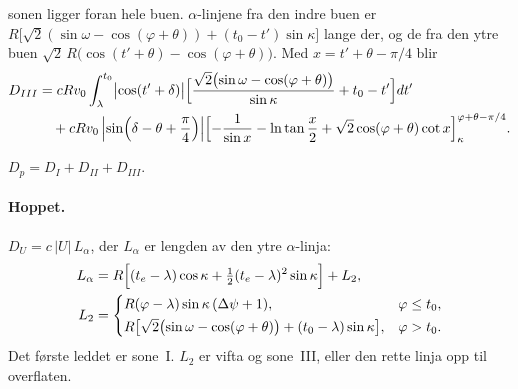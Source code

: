 \documentclass[11pt,a4paper]{article}
\begin{document}
\begin{itemize}
        sonen ligger foran hele buen.  $\alpha$-linjene fra den indre buen er
        $R\bigl[\sqrt2(\sin\omega - \cos(\varphi + \theta)) + (t_0 -
        t')\sin\kappa\bigr]$ lange der, og de fra den ytre buen
        $\sqrt2\,R\bigl(\cos(t' + \theta) - \cos(\varphi + \theta)\bigr)$.
        Med $x = t' + \theta - \pi/4$ blir
\begin{align}
  D_{III} &= c R v_0 \int_\lambda^{t_0} \bigl|\cos(t' + \delta)\bigr|
             \Bigl[\frac{\sqrt2\bigl(\sin\omega - \cos(\varphi + \theta)\bigr)}{\sin\kappa}
             + t_0 - t'\Bigr] dt'
             \nonumber\\
          &\quad + c R v_0 \,\Bigl|\sin\Bigl(\delta - \theta + \frac{\pi}{4}\Bigr)\Bigr|
             \Bigl[-\frac{1}{\sin x} - \ln\tan\frac{x}{2}
             + \sqrt2\cos(\varphi + \theta)\cot x\Bigr]_{\kappa}^{\varphi + \theta - \pi/4} .
\end{align}
\end{itemize}
$D_p = D_I + D_{II} + D_{III}$.

\paragraph{Hoppet.}  $D_U = c\,|U|\,L_\alpha$, der $L_\alpha$ er lengden av
den ytre $\alpha$-linja:
\begin{align}
  L_\alpha &= R\Bigl[(t_e - \lambda)\cos\kappa + \tfrac12 (t_e - \lambda)^2\sin\kappa\Bigr]
              + L_2 ,
  \label{eq:Lout}\\
  L_2 &= \begin{cases}
      R(\varphi - \lambda)\sin\kappa\,(\Delta\psi + 1) , & \varphi \le t_0 , \\[2pt]
      R\bigl[\sqrt2\bigl(\sin\omega - \cos(\varphi + \theta)\bigr) + (t_0 - \lambda)\sin\kappa\bigr] ,
      & \varphi > t_0 .
    \end{cases} \nonumber
\end{align}
Det første leddet er sone~I.  $L_2$ er vifta og sone~III, eller den rette
linja opp til overflaten.
\end{document}
